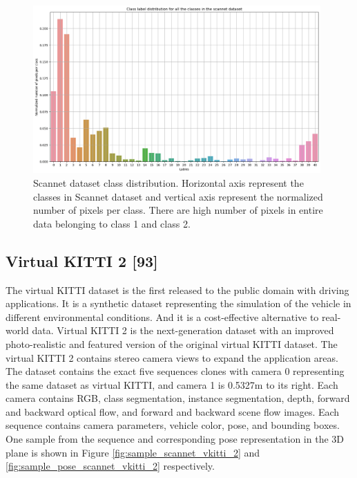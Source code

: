 	\begin{figure}
		\centering
		\includegraphics[width=11cm]{images/scannet_data_class_distribution.png}
		\caption{Scannet dataset class distribution. Horizontal axis represent the classes in Scannet dataset and vertical axis represent the normalized number of pixels per class. There are high number of pixels in entire data belonging to class 1 and class 2.}
		\label{fig:scannet_class_distribution}
	\end{figure}

    \subsection{Virtual KITTI 2 [93]}
    
	The virtual KITTI dataset is the first released to the public domain with driving applications. It is a synthetic dataset representing the simulation of the vehicle in different environmental conditions. And it is a cost-effective alternative to real-world data. Virtual KITTI 2 is the next-generation dataset with an improved photo-realistic and featured version of the original virtual KITTI dataset. The virtual KITTI 2 contains stereo camera views to expand the application areas. The dataset contains the exact five sequences clones with camera 0 representing the same dataset as virtual KITTI, and camera 1 is 0.5327m to its right. Each camera contains RGB, class segmentation, instance segmentation, depth, forward and backward optical flow, and forward and backward scene flow images. Each sequence contains camera parameters, vehicle color, pose, and bounding boxes. One sample from the sequence and corresponding pose representation in the 3D plane is shown in Figure \ref{fig:sample_scannet_vkitti_2} and \ref{fig:sample_pose_scannet_vkitti_2} respectively.
	 
